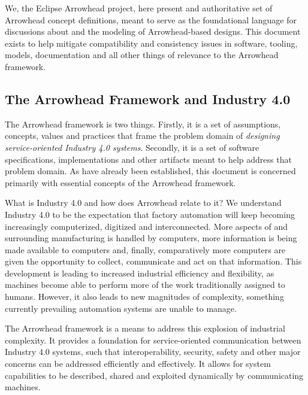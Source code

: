 %
%

We, the Eclipse Arrowhead project, here present and authoritative set of Arrowhead concept definitions, meant to serve as the foundational language for discussions about and the modeling of Arrowhead-based designs.
This document exists to help mitigate compatibility and consistency issues in software, tooling, models, documentation and all other things of relevance to the Arrowhead framework.

\subsection{The Arrowhead Framework and Industry 4.0}
\label{sec:introduction:arrowhead}

The Arrowhead framework is two things.
Firstly, it is a set of assumptions, concepts, values and practices that frame the problem domain of \textit{designing service-oriented Industry 4.0 systems}.
Secondly, it is a set of software specifications, implementations and other artifacts meant to help address that problem domain.
As have already been established, this document is concerned primarily with essential concepts of the Arrowhead framework.

What is Industry 4.0 and how does Arrowhead relate to it?
We understand Industry 4.0 to be the expectation that factory automation will keep becoming increasingly computerized, digitized and interconnected.
More aspects of and surrounding manufacturing is handled by computers, more information is being made available to computers and, finally, comparatively more computers are given the opportunity to collect, communicate and act on that information.
This development is leading to increased industrial efficiency and flexibility, as machines become able to perform more of the work traditionally assigned to humans.
However, it also leads to new magnitudes of complexity, something currently prevailing automation systems are unable to manage.

The Arrowhead framework is a means to address this explosion of industrial complexity.
It provides a foundation for service-oriented communication between Industry 4.0 systems, such that interoperability, security, safety and other major concerns can be addressed efficiently and effectively.
It allows for system capabilities to be described, shared and exploited dynamically by communicating machines.

